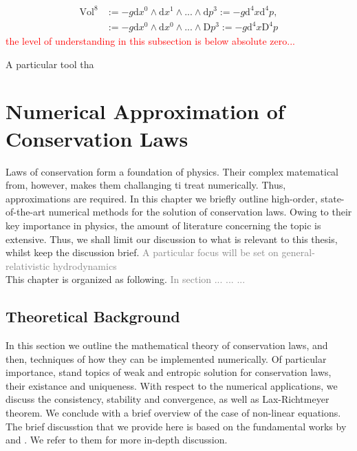 \documentclass[11pt,a4paper,headinclude=true,DIV=14,BCOR=8mm,chapterprefix,listof=totoc,twoside,openright,abstracton]{scrbook}
\newcommand{\red}[1]{\textcolor{red}{#1}}
\newcommand{\gray}[1]{\textcolor{gray}{#1}}
\begin{document}
\begin{align}
\text{Vol}^8 &:= -g \text{d}x^{0} \wedge \text{d}x^{1} \wedge ... \wedge \text{d}p^{3} := - g\text{d}^{4}x \text{d}^{4}p, \\
&:= -g \text{d}x^{0} \wedge \text{d}x^{0} \wedge ... \wedge \text{D}p^{3} :=-g \text{d}^{4}x\text{D}^4 p
\end{align}
\red{the level of understanding in this subsection is below absolute zero...}

A particular tool tha




\chapter{Numerical Approximation of Conservation Laws}
\label{ch:theory:grhd_num_methods}

Laws of conservation form a foundation of physics. Their complex matematical from, however, makes them challanging ti treat numerically. Thus, approximations are required. In this chapter we briefly outline high-order, state-of-the-art numerical methods for the solution of conservation laws. Owing to their key importance in physics, the amount of literature concerning the topic is extensive. Thus, we shall limit our discussion to what is relevant to this thesis, whilst keep the discussion brief. \gray{A particular focus will be set on general-relativistic hydrodynamics} \\

This chapter is organized as following. \gray{In section ... ... ... }

\section{Theoretical Background}
\label{sec:theory:conserv_laws:theorback}

In this section we outline the mathematical theory of conservation laws, and then, techniques of how they can be implemented numerically. Of particular importance, stand topics of weak and entropic solution for conservation laws, their existance and uniqueness. With respect to the numerical applications, we discuss the consistency, stability and convergence, as well as Lax-Richtmeyer theorem. We conclude with a brief overview of the case of non-linear equations. The brief discusstion that we provide here is based on the fundamental works by \cite{LeVeque:1992} and \cite{Tadmor1998}. We refer to them for more in-depth discussion. 
\end{document}
